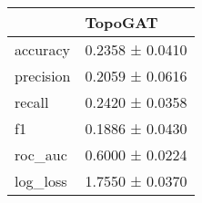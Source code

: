 \begin{tabular}{ll}
\toprule
 & TopoGAT \\
\midrule
accuracy & 0.2358 ± 0.0410 \\
precision & 0.2059 ± 0.0616 \\
recall & 0.2420 ± 0.0358 \\
f1 & 0.1886 ± 0.0430 \\
roc_auc & 0.6000 ± 0.0224 \\
log_loss & 1.7550 ± 0.0370 \\
\bottomrule
\end{tabular}
